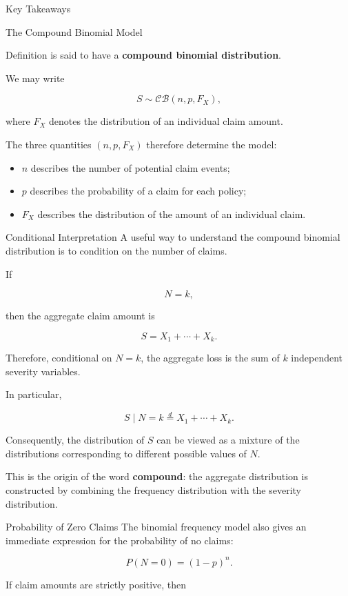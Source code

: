 \documentclass[
  ignorenonframetext,
  aspectratio=169,
]{beamer}
\providecommand{\tightlist}{%
  \setlength{\itemsep}{0pt}\setlength{\parskip}{0pt}}
\begin{document}
\begin{frame}{Key Takeaways}
\begin{block}{The Compound Binomial Model}
\begin{block}{Definition}
is said to have a \textbf{compound binomial distribution}.

We may write

\[
\boxed{
S\sim\mathcal{CB}(n,p,F_X),
}
\]

where \(F_X\) denotes the distribution of an individual claim amount.

The three quantities \((n,p,F_X)\) therefore determine the model:

\begin{itemize}
\tightlist
\item
  \(n\) describes the number of potential claim events;
\item
  \(p\) describes the probability of a claim for each policy;
\item
  \(F_X\) describes the distribution of the amount of an individual
  claim.
\end{itemize}
\end{block}

\begin{block}{Conditional Interpretation}
\protect{}\label{conditional-interpretation}
A useful way to understand the compound binomial distribution is to
condition on the number of claims.

If

\[
N=k,
\]

then the aggregate claim amount is

\[
S=X_1+\cdots+X_k.
\]

Therefore, conditional on \(N=k\), the aggregate loss is the sum of
\(k\) independent severity variables.

In particular,

\[
S\mid N=k
\overset{d}{=}
X_1+\cdots+X_k.
\]

Consequently, the distribution of \(S\) can be viewed as a mixture of
the distributions corresponding to different possible values of \(N\).

This is the origin of the word \textbf{compound}: the aggregate
distribution is constructed by combining the frequency distribution with
the severity distribution.
\end{block}

\begin{block}{Probability of Zero Claims}
\protect{}\label{probability-of-zero-claims}
The binomial frequency model also gives an immediate expression for the
probability of no claims:

\[
P(N=0)
=
(1-p)^n.
\]

If claim amounts are strictly positive, then


\end{block}
\end{block}
\end{frame}
\end{document}
